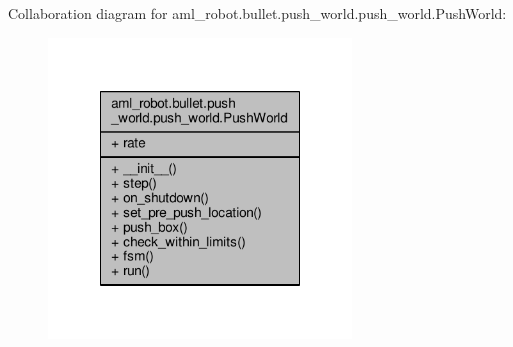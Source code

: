 Collaboration diagram for aml\-\_\-robot.\-bullet.\-push\-\_\-world.\-push\-\_\-world.\-Push\-World\-:
\nopagebreak
\begin{figure}[H]
\begin{center}
\leavevmode
\includegraphics[width=228pt]{classaml__robot_1_1bullet_1_1push__world_1_1push__world_1_1_push_world__coll__graph}
\end{center}
\end{figure}
